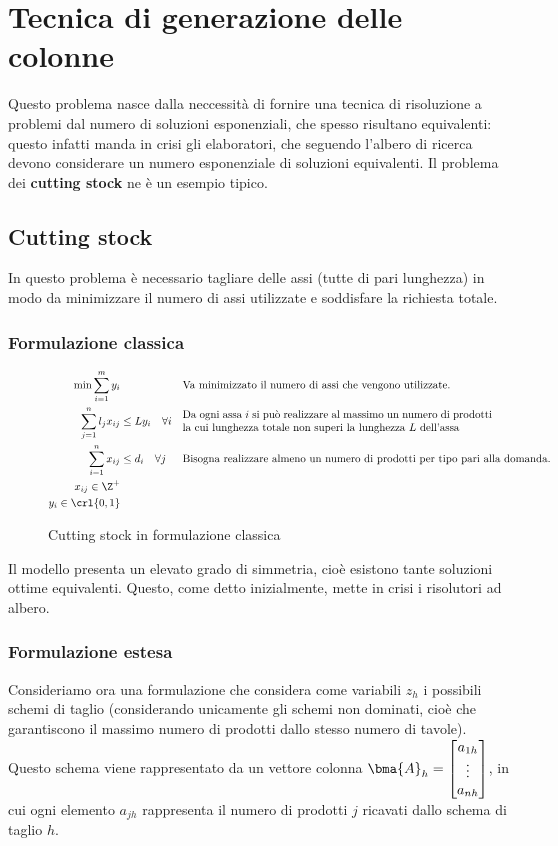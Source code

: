 \documentclass[\main/main.tex]{subfiles}
\begin{document}
\chapter{Tecnica di generazione delle colonne}
Questo problema nasce dalla neccessità di fornire una tecnica di risoluzione a problemi dal numero di soluzioni esponenziali, che spesso risultano equivalenti: questo infatti manda in crisi gli elaboratori, che seguendo l'albero di ricerca devono considerare un numero esponenziale di soluzioni equivalenti. Il problema dei \textbf{cutting stock} ne è un esempio tipico.

\section{Cutting stock}
In questo problema è necessario tagliare delle assi (tutte di pari lunghezza) in modo da minimizzare il numero di assi utilizzate e soddisfare la richiesta totale.

\subsection{Formulazione classica}

\begin{figure}
\begin{align*}
    \min \sum_{i=1}^m y_i & && \text{Va minimizzato il numero di assi che vengono utilizzate.}\\
    \sum_{j=1}^n l_j x_{ij} &\leq L y_i \quad \forall i &&\parbox{10cm}{Da ogni assa \(i\) si può realizzare al massimo un numero di prodotti la cui lunghezza totale non superi la lunghezza \(L\) dell'assa}\\
    \sum_{i=1}^n x_{ij} &\leq d_i \quad \forall j &&\text{Bisogna realizzare almeno un numero di prodotti per tipo pari alla domanda.}\\
    x_{ij} \in \Z^+\\
    y_i \in \crl{0,1}\\
\end{align*}
\caption{Cutting stock in formulazione classica}
\end{figure}

Il modello presenta un elevato grado di simmetria, cioè esistono tante soluzioni ottime equivalenti. Questo, come detto inizialmente, mette in crisi i risolutori ad albero.

\subsection{Formulazione estesa}
Consideriamo ora una formulazione che considera come variabili \(z_h\) i possibili schemi di taglio (considerando unicamente gli schemi non dominati, cioè che garantiscono il massimo numero di prodotti dallo stesso numero di tavole). Questo schema viene rappresentato da un vettore colonna \(\bma{A}_h = \begin{bmatrix}
    a_{1h}\\
    \vdots \\
    a_{nh}
\end{bmatrix}\), in cui ogni elemento \(a_{jh}\) rappresenta il numero di prodotti \(j\) ricavati dallo schema di taglio \(h\).
\end{document}
